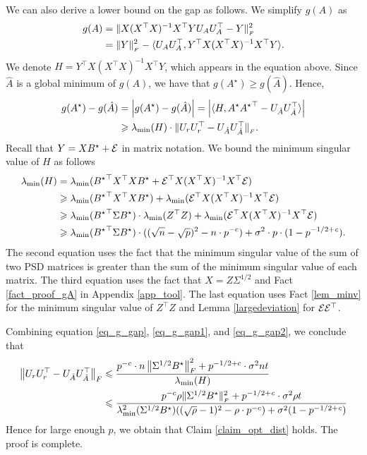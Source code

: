 	We can also derive a lower bound on the gap as follows.
	We simplify $g(A)$ as
	\begin{align*}
		g(A)  &= \|X (X^{\top}X)^{-1} X^{\top} Y U_A U_A^{\top} - Y\|_{_{F}}^2 \\
					&= \|Y\|_{_{F}}^2 - \langle U_A U_A^{\top}, Y^{\top} X (X^{\top} X)^{-1} X^{\top} Y \rangle.
	\end{align*}
	We denote $H = Y^{\top} X (X^{\top} X)^{-1} X^{\top} Y$, which appears in the equation above.
	Since $\hat{A}$ is a global minimum of $g(A)$, we have that $g(A^{\star}) \ge g(\hat{A})$.
	Hence,
	\begin{align}
		g(A^{\star}) - g(\hat{A}) &= \left\lvert g(A^{\star}) - g(\hat{A})\right\rvert = \left\lvert\langle H, A^{\star} {A^{\star}}^{\top} - U_{\hat{A}} U_{\hat{A}}^{\top} \rangle\right\rvert \nonumber \\
												&\geqslant \lambda_{\min}(H) \cdot \|U_r U_r^{\top} - U_{\hat{A}} U_{\hat{A}}^{\top}\|_{_{F}}. \label{eq_g_gap1}
	\end{align}
	Recall that $Y = X B^{\star} + \mathcal{E}$ in matrix notation.
	We bound the minimum singular value of $H$ as follows
	\begin{align}
		\lambda_{\min}(H) &= \lambda_{\min}({B^{\star}}^{\top} X^{\top} X B^{\star} + \mathcal{E}^{\top} X (X^{\top} X)^{-1} X^{\top} \mathcal{E}) \nonumber \\
		&\geqslant \lambda_{\min}({B^{\star}}^{\top}X^{\top}X B^{\star}) + \lambda_{\min}(\mathcal{E}^{\top} X (X^{\top} X)^{-1} X^{\top} \mathcal{E}) \nonumber \\
		&\geqslant \lambda_{\min}({B^{\star}}^{\top}\Sigma B^{\star}) \cdot \lambda_{\min}(Z^{\top}Z) + \lambda_{\min}(\mathcal{E}^{\top} X (X^{\top} X)^{-1} X^{\top} \mathcal{E}) \nonumber \\
		&\geqslant \lambda_{\min}({B^{\star}}^{\top}\Sigma B^{\star}) \cdot ((\sqrt n - \sqrt p)^2 - n \cdot p^{-c}) + \sigma^2 \cdot p \cdot (1 - p^{-1/2 + {\mathit{c}}}). \label{eq_g_gap2}
	\end{align}
	The second equation uses the fact that the minimum singular value of the sum of two PSD matrices is greater than the sum of the minimum singular value of each matrix.
	The third equation uses the fact that $X = Z \Sigma^{1/2}$ and Fact \ref{fact_proof_gA} in Appendix \ref{app_tool}.
	The last equation uses Fact \ref{lem_minv} for the minimum singular value of $Z^{\top}Z$ and Lemma \ref{largedeviation} for $\mathcal{E}\mathcal{E}^{\top}$.

	Combining equation \eqref{eq_g_gap}, \eqref{eq_g_gap1}, and \eqref{eq_g_gap2}, we conclude that
	\begin{align*}
		\left\| U_r U_r^{\top} - U_{\hat{A}} U_{\hat{A}}^{\top} \right\|_{F}
		&\leqslant \frac{p^{-c} \cdot n \left\| \Sigma^{1/2} B^{\star} \right\|_{F}^2 + p^{-1/2 + c} \cdot \sigma^2 nt} {\lambda_{\min}(H)} \\
		&\leqslant \frac{p^{-c} \rho \|\Sigma^{1/2} B^{\star}\|_{_{F}}^2 + p^{-1/2 + {\mathit{c}}} \cdot \sigma^2 \rho t}{\lambda_{\min}^2(\Sigma^{1/2} B^{\star}) ((\sqrt{\rho} - 1)^2 - \rho \cdot p^{-c}) + \sigma^2 (1 - p^{-1/2 + {\mathit{c}}})}
	\end{align*}
	Hence for large enough $p$, we obtain that Claim \ref{claim_opt_dist} holds.
	The proof is complete.

